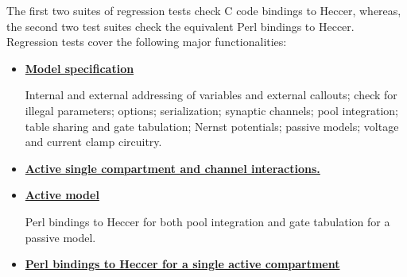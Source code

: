 \documentclass[12pt]{article}
\begin{document}
The first two suites of regression tests check C code bindings to Heccer, whereas, the second two test suites check the equivalent Perl bindings to Heccer. Regression tests cover the following major functionalities:
\begin{itemize}
\item[]\href{http://www.neurospaces.org/neurospaces_project/heccer/tests/html/specifications/main.html}{\bf Model specification}

Internal and external addressing of variables and external callouts; check for illegal parameters; options; serialization; synaptic channels; pool integration; table sharing and gate tabulation; Nernst potentials; passive models; voltage and current clamp circuitry.

\item[]\href{http://www.neurospaces.org/neurospaces_project/heccer/tests/html/specifications/active/main.html}{\bf Active single compartment and channel interactions.}

\item[]\href{http://www.neurospaces.org/neurospaces_project/heccer/tests/html/specifications/glue/swig/perl/main.html}{\bf Active model}

Perl bindings to Heccer for both pool integration and gate tabulation for a passive model.

\item[]\href{http://www.neurospaces.org/neurospaces_project/heccer/tests/html/specifications/glue/swig/perl/active/main.html}{\bf Perl bindings to Heccer for a single active compartment}
\end{itemize}
\end{document}
